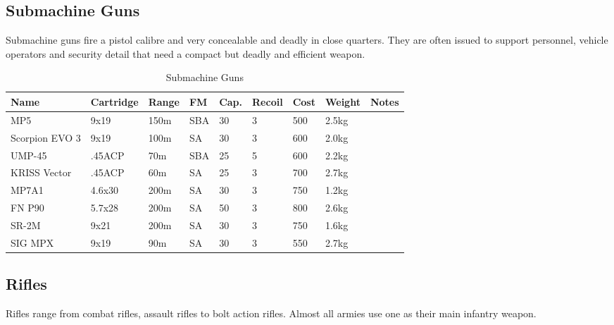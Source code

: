 \subsection{Submachine Guns}
\label{sub:9-Submachine Guns}

Submachine guns fire a pistol calibre and very concealable and deadly in close
quarters. They are often issued to support personnel, vehicle operators and
security detail that need a compact but deadly and efficient weapon.

\begin{table}
  \caption{Submachine Guns}
  \label{tab:SMG}
  \begin{center}
    \begin{tabular}{| l | l | l | l | l | l | l | l | l |}
      \hline
      \textbf{Name} & \textbf{Cartridge} & \textbf{Range} &
      \textbf{FM} & \textbf{Cap.} & \textbf{Recoil} &
      \textbf{Cost} & \textbf{Weight} & \textbf{Notes} \\ \hline

      MP5            & 9x19   & 150m & SBA & 30 & 3 & 500 & 2.5kg & \\ \hline
      Scorpion EVO 3 & 9x19   & 100m & SA  & 30 & 3 & 600 & 2.0kg & \\ \hline

      UMP-45         & .45ACP &  70m & SBA & 25 & 5 & 600 & 2.2kg & \\ \hline
      KRISS Vector   & .45ACP &  60m & SA  & 25 & 3 & 700 & 2.7kg & \\ \hline

      MP7A1          & 4.6x30 & 200m & SA  & 30 & 3 & 750 & 1.2kg & \\ \hline
      FN P90         & 5.7x28 & 200m & SA  & 50 & 3 & 800 & 2.6kg & \\ \hline
      SR-2M          & 9x21   & 200m & SA  & 30 & 3 & 750 & 1.6kg & \\ \hline
      SIG MPX        & 9x19   &  90m & SA  & 30 & 3 & 550 & 2.7kg & \\ \hline

    \end{tabular}
  \end{center}
\end{table}

\subsection{Rifles}
\label{sub:9-Rifles}

Rifles range from combat rifles, assault rifles to bolt action rifles. Almost
all armies use one as their main infantry weapon.

